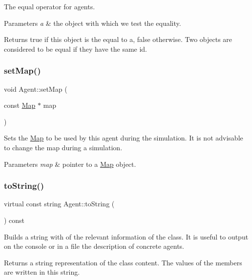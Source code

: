 The equal operator for agents. 
\begin{DoxyParams}{Parameters}
{\em a} & the object with which we test the equality. \\
\hline
\end{DoxyParams}
\begin{DoxyReturn}{Returns}
true if this object is the equal to a, false otherwise. Two objects are considered to be equal if they have the same id. 
\end{DoxyReturn}
\mbox{\label{class_agent_a87a661874cffb03fa9e474e872810260}} 
\subsubsection{\texorpdfstring{set\+Map()}{setMap()}}
{\footnotesize\ttfamily void Agent\+::set\+Map (\begin{DoxyParamCaption}\item[{const \hyperlink{class_map}{Map} $\ast$}]{map }\end{DoxyParamCaption})}

Sets the \hyperlink{class_map}{Map} to be used by this agent during the simulation. It is not advisable to change the map during a simulation. 
\begin{DoxyParams}{Parameters}
{\em map} & pointer to a \hyperlink{class_map}{Map} object. \\
\hline
\end{DoxyParams}
\mbox{\label{class_agent_a44f291596d10c7878b0641d6ec156328}} 
\subsubsection{\texorpdfstring{to\+String()}{toString()}}
{\footnotesize\ttfamily virtual const string Agent\+::to\+String (\begin{DoxyParamCaption}{ }\end{DoxyParamCaption}) const\hspace{0.3cm}{\ttfamily [pure virtual]}}

Builds a string with of the relevant information of the class. It is useful to output on the console or in a file the description of concrete agents. \begin{DoxyReturn}{Returns}
a string representation of the class content. The values of the members are written in this string. 
\end{DoxyReturn}


